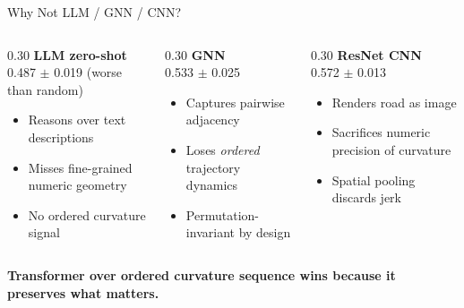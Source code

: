 \documentclass[aspectratio=169,10pt]{beamer}
\newcommand{\hlg}[1]{\textcolor{successgreen}{\textbf{#1}}}
\newcommand{\hlr}[1]{\textcolor{alertred}{\textbf{#1}}}
\begin{document}
\begin{frame}{Why Not LLM / GNN / CNN?}
  \begin{columns}[T]
    \begin{column}{0.30\linewidth}
      \textbf{\hlr{LLM zero-shot}}\\[4pt]
      0.487 $\pm$ 0.019 (worse than random)
      \vspace{6pt}
      \begin{itemize}
        \item Reasons over text descriptions
        \item Misses fine-grained numeric geometry
        \item No ordered curvature signal
      \end{itemize}
    \end{column}
    \begin{column}{0.30\linewidth}
      \textbf{\hlr{GNN}}\\[4pt]
      0.533 $\pm$ 0.025
      \vspace{6pt}
      \begin{itemize}
        \item Captures pairwise adjacency
        \item Loses \emph{ordered} trajectory dynamics
        \item Permutation-invariant by design
      \end{itemize}
    \end{column}
    \begin{column}{0.30\linewidth}
      \textbf{\hlr{ResNet CNN}}\\[4pt]
      0.572 $\pm$ 0.013
      \vspace{6pt}
      \begin{itemize}
        \item Renders road as image
        \item Sacrifices numeric precision of curvature
        \item Spatial pooling discards jerk
      \end{itemize}
    \end{column}
  \end{columns}
  \vspace{10pt}
  \begin{center}
  \large
  \hlg{Transformer over ordered curvature sequence wins because it preserves what matters.}
  \end{center}
\end{frame}
\end{document}
